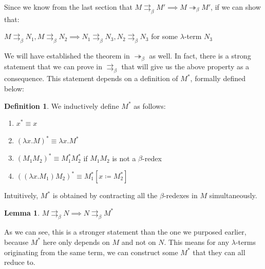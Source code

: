 \documentclass[a4paper,11pt]{article}
\theoremstyle{definition}
\newtheorem{definition}{Definition}[section]
\theoremstyle{example}
\theoremstyle{lemma}
\newtheorem{lemma}{Lemma}
\newcommand{\lamterm}[2]{\lambda #1. #2}
\newcommand{\subs}[3]{#1[#2\coloneqq#3]}
\newcommand{\msbr}{\twoheadrightarrow_{\beta}}
\newcommand{\pbr}{\rightrightarrows_{\beta}}
\begin{document}
Since we know from the last section that $M \pbr M' \implies M \msbr M'$, if we can show that:
\begin{center}
    $M \pbr N_1, M \pbr N_2 \implies N_1 \pbr N_3, N_2 \pbr N_3$ for some $\lambda$-term $N_3$ 
\end{center}
We will have established the theorem in $\msbr$ as well. In fact, there is a strong statement that we can prove in $\pbr$ that will give us the above property as a consequence. This statement depends on a definition of $M^*$, formally defined below:
\begin{definition}
We inductively define $M^*$ as follows:
\begin{enumerate}[topsep=2pt,itemsep=-0.5ex,partopsep=1ex,parsep=1ex]
    \item $x^* \equiv x$
    \item $(\lamterm{x}{M})^* \equiv \lamterm{x}{M^*}$
    \item $(M_1M_2)^* \equiv M_1^*M_2^*$ if $M_1M_2$ is not a $\beta$-redex
    \item $((\lamterm{x}{M_1})M_2)^* \equiv \subs{M_1^*}{x}{M_2^*}$
\end{enumerate}
\end{definition}
Intuitively, $M^*$ is obtained by contracting all the $\beta$-redexes in $M$ simultaneously.
\begin{lemma}
$M \pbr N \implies N \pbr M^*$
\end{lemma}
As we can see, this is a stronger statement than the one we purposed earlier, because $M^*$ here only depends on $M$ and not on $N$. This means for any $\lambda$-terms originating from the same term, we can construct some $M^*$ that they can all reduce to.
\end{document}
